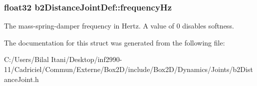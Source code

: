 \subsubsection[{\texorpdfstring{frequency\+Hz}{frequencyHz}}]{\setlength{\rightskip}{0pt plus 5cm}float32 b2\+Distance\+Joint\+Def\+::frequency\+Hz}\hypertarget{structb2_distance_joint_def_a35e2362bcb6c58734f95d0ac045863ea}{}\label{structb2_distance_joint_def_a35e2362bcb6c58734f95d0ac045863ea}
The mass-\/spring-\/damper frequency in Hertz. A value of 0 disables softness. 

The documentation for this struct was generated from the following file\+:\begin{DoxyCompactItemize}
\item 
C\+:/\+Users/\+Bilal Itani/\+Desktop/inf2990-\/11/\+Cadriciel/\+Commun/\+Externe/\+Box2\+D/include/\+Box2\+D/\+Dynamics/\+Joints/b2\+Distance\+Joint.\+h\end{DoxyCompactItemize}
